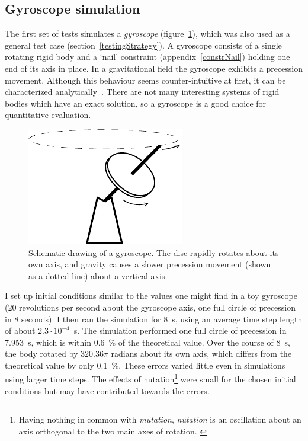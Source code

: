 \subsection{Gyroscope simulation\label{evalGyroscope}}
The first set of tests simulates a \emph{gyroscope} (figure~\ref{gyroscope}), which was also used
as a general test case (section~\ref{testingStrategy}). A gyroscope consists of a single rotating
rigid body and a `nail' constraint (appendix~\ref{constrNail}) holding one end of its axis in
place. In a gravitational field the gyroscope exhibits a precession movement. Although this
behaviour seems counter-intuitive at first, it can be characterized analytically~\cite{Julian:notes}.
There are not many interesting systems of rigid bodies which have an exact solution, so a
gyroscope is a good choice for quantitative evaluation.

\begin{figure}
\centerline{\includegraphics{figures/gyroscope}}
\caption{Schematic drawing of a gyroscope. The disc rapidly rotates about its own axis, and
    gravity causes a slower precession movement (shown as a dotted line) about a vertical axis.
    \label{gyroscope}}
\end{figure}

I set up initial conditions similar to the values one might find in a toy gyroscope (20
revolutions per second about the gyroscope axis, one full circle of precession in 8 seconds). I
then ran the simulation for 8~s, using an average time step length of about $2.3\cdot 10^{-4}$~s.
The simulation performed one full circle of precession in 7.953~s, which
is within 0.6~\% of the theoretical value. Over the course of 8~s, the body rotated by $320.36\pi$
radians about its own axis, which differs from the theoretical value by only 0.1~\%. These errors
varied little even in simulations using larger time steps. The effects of nutation\footnote{Having
nothing in common with \emph{mutation}, \emph{nutation} is an oscillation about an axis
orthogonal to the two main axes of rotation. \cite{Feynman:63}} were small for the chosen initial
conditions but may have contributed towards the errors.

